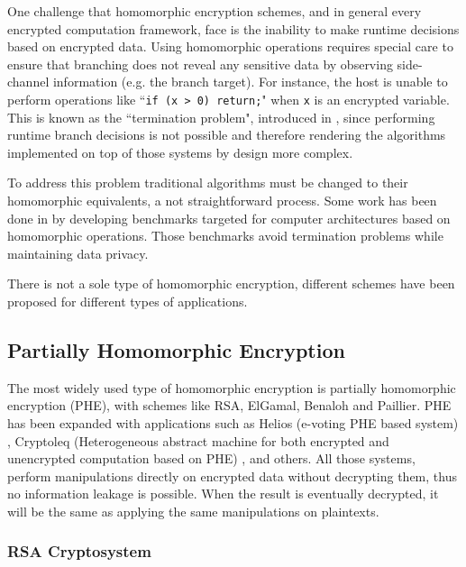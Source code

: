 One challenge that homomorphic encryption schemes, and in general every encrypted computation framework, face is the inability to make runtime decisions based on encrypted data.
Using homomorphic operations requires special care to ensure that branching does not reveal any sensitive data by observing side-channel information (e.g. the branch target).
For instance, the host is unable to perform operations like ``\texttt{if (x > 0) return;}" when \texttt{x} is an encrypted variable.
This is known as the ``termination problem", introduced in \cite{brenner2011secret}, since performing runtime branch decisions is not possible and therefore rendering the algorithms implemented on top of those systems by design more complex.


To address this problem traditional algorithms must be changed to their homomorphic equivalents, a not straightforward process.
Some work has been done in \cite{mouris2018terminator} by developing benchmarks targeted for computer architectures based on homomorphic operations.
Those benchmarks avoid termination problems while maintaining data privacy.


There is not a sole type of homomorphic encryption, different schemes have been proposed for different types of applications.


\subsection{Partially Homomorphic Encryption}\label{ss:phe}
The most widely used type of homomorphic encryption is partially homomorphic encryption (PHE), with schemes like RSA, ElGamal, Benaloh and Paillier.
PHE has been expanded with applications such as Helios (e-voting PHE based system) \cite{adida2008helios}, Cryptoleq (Heterogeneous abstract machine for both encrypted and unencrypted computation based on PHE) \cite{mazonka2016cryptoleq}, and others.
All those systems, perform manipulations directly on encrypted data without decrypting them, thus no information leakage is possible.
When the result is eventually decrypted, it will be the same as applying the same manipulations on plaintexts.

\subsubsection{RSA Cryptosystem}\label{ss:rsa}



